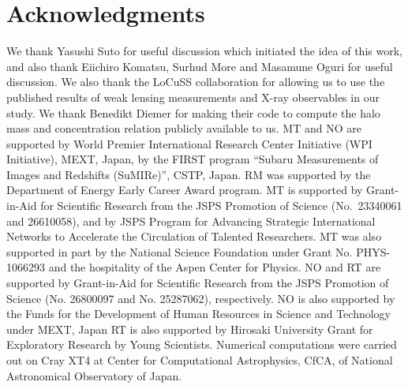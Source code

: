 \documentclass[iop, apj]{emulateapj}
\newcommand{\?}{\stackrel{?}{=}}
\begin{document}
\section*{Acknowledgments}

We thank Yasushi Suto for useful discussion which initiated the idea of
this work, and also thank Eiichiro Komatsu, Surhud More and Masamune
Oguri for useful discussion. We also thank the LoCuSS collaboration for
allowing us to use the published results of weak lensing measurements
and X-ray observables in our study.  We thank Benedikt Diemer for making
their code to compute the halo mass and concentration relation publicly
available to us.  MT and NO are supported by World Premier International
Research Center Initiative (WPI Initiative), MEXT, Japan, by the FIRST
program ``Subaru Measurements of Images and Redshifts (SuMIRe)'', CSTP,
Japan. RM was supported by the Department of Energy Early Career Award
program.  MT is supported by Grant-in-Aid for Scientific Research from
the JSPS Promotion of Science (No.~23340061 and 26610058), and by JSPS
Program for Advancing Strategic International Networks to Accelerate the
Circulation of Talented Researchers.  MT was also supported in part by
the National Science Foundation under Grant No. PHYS-1066293 and the
hospitality of the Aspen Center for Physics.  NO and RT are supported by
Grant-in-Aid for Scientific Research from the JSPS Promotion of Science
(No. 26800097 and No. 25287062), respectively.
NO is also supported by the Funds
for the Development of Human Resources in Science and
Technology under MEXT, Japan
RT is also supported by
Hirosaki University Grant for Exploratory Research by Young Scientists.
Numerical computations were carried out on Cray XT4 at Center for
Computational Astrophysics, CfCA, of National Astronomical Observatory
of Japan.




\end{document}
